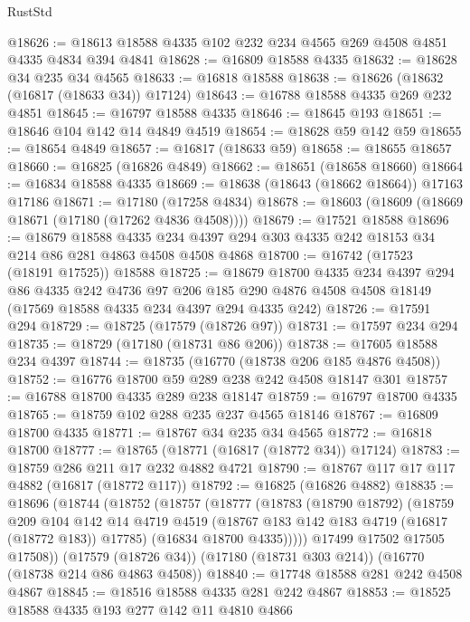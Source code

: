 \begin{lexlean}{RustStd}
\begin{coremodule}
{\begin{coremodule}
{{{{{{{{{{{{{{{{{{{{{{{{{{{{{{{{{{{{{{{{{{{{{{{{{{{{{{{@18626 := @18613 @18588 @4335 @102 @232 @234 @4565 @269 @4508 @4851 @4335 @4834 @394 @4841
@18628 := @16809 @18588 @4335
@18632 := @18628 @34 @235 @34 @4565
@18633 := @16818 @18588
@18638 := @18626 (@18632 (@16817 (@18633 @34)) @17124)
@18643 := @16788 @18588 @4335 @269 @232 @4851
@18645 := @16797 @18588 @4335
@18646 := @18645 @193
@18651 := @18646 @104 @142 @14 @4849 @4519
@18654 := @18628 @59 @142 @59
@18655 := @18654 @4849
@18657 := @16817 (@18633 @59)
@18658 := @18655 @18657
@18660 := @16825 (@16826 @4849)
@18662 := @18651 (@18658 @18660)
@18664 := @16834 @18588 @4335
@18669 := @18638 (@18643 (@18662 @18664)) @17163 @17186
@18671 := @17180 (@17258 @4834)
@18678 := @18603 (@18609 (@18669 @18671 (@17180 (@17262 @4836 @4508))))
@18679 := @17521 @18588
@18696 := @18679
    @18588
    @4335
    @234
    @4397
    @294
    @303
    @4335
    @242
    @18153
    @34
    @214
    @86
    @281
    @4863
    @4508
    @4508
    @4868
@18700 := @16742 (@17523 (@18191 @17525)) @18588
@18725 := @18679
    @18700
    @4335
    @234
    @4397
    @294
    @86
    @4335
    @242
    @4736
    @97
    @206
    @185
    @290
    @4876
    @4508
    @4508
    @18149
    (@17569 @18588 @4335 @234 @4397 @294 @4335 @242)
@18726 := @17591 @294
@18729 := @18725 (@17579 (@18726 @97))
@18731 := @17597 @234 @294
@18735 := @18729 (@17180 (@18731 @86 @206))
@18738 := @17605 @18588 @234 @4397
@18744 := @18735 (@16770 (@18738 @206 @185 @4876 @4508))
@18752 := @16776 @18700 @59 @289 @238 @242 @4508 @18147 @301
@18757 := @16788 @18700 @4335 @289 @238 @18147
@18759 := @16797 @18700 @4335
@18765 := @18759 @102 @288 @235 @237 @4565 @18146
@18767 := @16809 @18700 @4335
@18771 := @18767 @34 @235 @34 @4565
@18772 := @16818 @18700
@18777 := @18765 (@18771 (@16817 (@18772 @34)) @17124)
@18783 := @18759 @286 @211 @17 @232 @4882 @4721
@18790 := @18767 @117 @17 @117 @4882 (@16817 (@18772 @117))
@18792 := @16825 (@16826 @4882)
@18835 := @18696
    (@18744
      (@18752
        (@18757
          (@18777
            (@18783
              (@18790 @18792)
              (@18759
                @209
                @104
                @142
                @14
                @4719
                @4519
                (@18767 @183 @142 @183 @4719 (@16817 (@18772 @183)) @17785)
                (@16834 @18700 @4335)))))
        @17499
        @17502
        @17505
        @17508))
    (@17579 (@18726 @34))
    (@17180 (@18731 @303 @214))
    (@16770 (@18738 @214 @86 @4863 @4508))
@18840 := @17748 @18588 @281 @242 @4508 @4867
@18845 := @18516 @18588 @4335 @281 @242 @4867
@18853 := @18525 @18588 @4335 @193 @277 @142 @11 @4810 @4866
}}}}}}}}}}}}}}}}}}}}}}}}}}}}}}}}}}}}}}}}}}}}}}}}}}}}}}}
\end{coremodule}}
\end{coremodule}
\end{lexlean}
